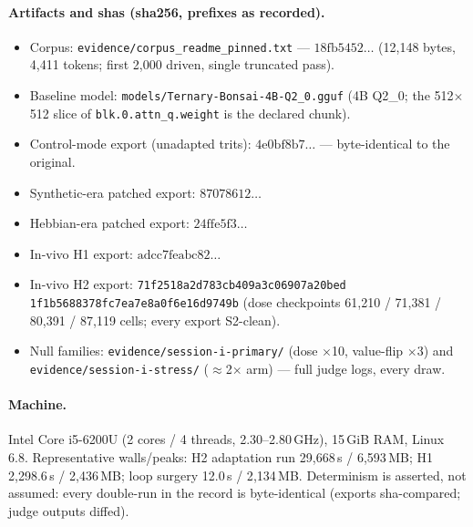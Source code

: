\paragraph{Artifacts and shas (sha256, prefixes as recorded).}
\begin{itemize}
\item Corpus: \texttt{evidence/corpus\_readme\_pinned.txt} ---
  $18\mathrm{fb}5452\ldots$ (12{,}148 bytes, 4{,}411 tokens; first
  2{,}000 driven, single truncated pass).
\item Baseline model: \texttt{models/Ternary-Bonsai-4B-Q2\_0.gguf}
  (4B Q2\_0; the 512$\times$512 slice of
  \texttt{blk.0.attn\_q.weight} is the declared chunk).
\item Control-mode export (unadapted trits): $4\mathrm{e}0
  \mathrm{bf}8\mathrm{b}7\ldots$ --- byte-identical to the original.
\item Synthetic-era patched export: $87078612\ldots$
\item Hebbian-era patched export: $24\mathrm{ffe}5\mathrm{f}3\ldots$
\item In-vivo H1 export: $\mathrm{adcc}7\mathrm{feabc}82\ldots$
\item In-vivo H2 export: \texttt{71f2518a2d783cb409a3c06907a20bed
  1f1b5688378fc7ea7e8a0f6e16d9749b} (dose checkpoints 61{,}210 / 71{,}381 /
  80{,}391 / 87{,}119 cells; every export S2-clean).
\item Null families: \texttt{evidence/}\allowbreak\texttt{session-i-primary/}
  (dose $\times$10, value-flip $\times$3) and
  \texttt{evidence/}\allowbreak\texttt{session-i-stress/} ($\approx$2$\times$ arm) ---
  full judge logs, every draw.
\end{itemize}

\paragraph{Machine.} Intel Core i5-6200U (2 cores / 4 threads,
2.30--2.80\,GHz), 15\,GiB RAM, Linux 6.8. Representative walls/peaks:
H2 adaptation run 29{,}668\,s / 6{,}593\,MB; H1 2{,}298.6\,s /
2{,}436\,MB; loop surgery 12.0\,s / 2{,}134\,MB. Determinism is
asserted, not assumed: every double-run in the record is
byte-identical (exports sha-compared; judge outputs diffed).
